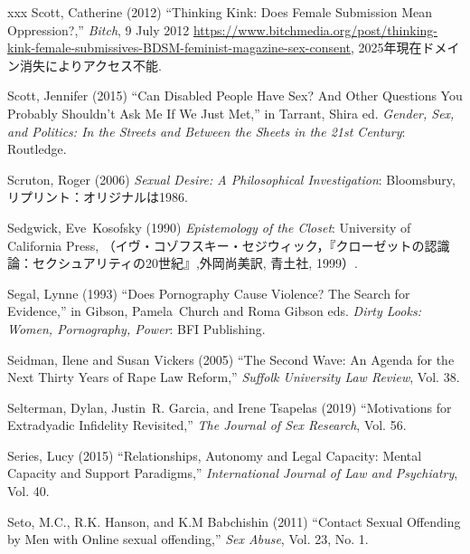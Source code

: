 \documentclass[]{jlreq} \usepackage{mystyle}
\begin{document}
\begin{thebibliography}{xxx}
Scott, Catherine (2012) ``Thinking Kink: Does Female Submission Mean
  Oppression?,'' \emph{Bitch}, 9 July 2012
  \url{https://www.bitchmedia.org/post/thinking-kink-female-submissives-BDSM-feminist-magazine-sex-consent},
  2025年現在ドメイン消失によりアクセス不能.

Scott, Jennifer (2015) ``Can Disabled People Have Sex? And Other Questions You
  Probably Shouldn't Ask Me If We Just Met,'' in Tarrant, Shira ed.   \textit{
  Gender, Sex, and Politics: In the Streets and Between the Sheets in the 21st
  Century}: Routledge.

Scruton, Roger (2006)  \textit{ Sexual Desire: A Philosophical Investigation}:
  Bloomsbury, リプリント：オリジナルは1986.

Sedgwick, Eve~Kosofsky (1990)  \textit{ Epistemology of the Closet}: University
  of California Press,
  （イヴ・コゾフスキー・セジウィック，『クローゼットの認識論：セクシュアリティの20世紀』,外岡尚美訳,
  青土社, 1999）.

Segal, Lynne (1993) ``Does Pornography Cause Violence? The Search for
  Evidence,'' in Gibson, Pamela~Church and Roma Gibson eds.   \textit{ Dirty
  Looks: Women, Pornography, Power}: BFI Publishing.

Seidman, Ilene and Susan Vickers (2005) ``The Second Wave: An Agenda for the
  Next Thirty Years of Rape Law Reform,'' \textit{ Suffolk University Law
  Review}, Vol. 38.

Selterman, Dylan, Justin~R. Garcia, and Irene Tsapelas (2019) ``Motivations for
  Extradyadic Infidelity Revisited,'' \textit{ The Journal of Sex Research},
  Vol. 56.

Series, Lucy (2015) ``Relationships, Autonomy and Legal Capacity: Mental
  Capacity and Support Paradigms,'' \textit{ International Journal of Law and
  Psychiatry}, Vol. 40.

Seto, M.C., R.K. Hanson, and K.M Babchishin (2011) ``Contact Sexual Offending
  by Men with Online sexual offending,'' \textit{ Sex Abuse}, Vol. 23, No. 1.


\end{thebibliography}
\end{document}
